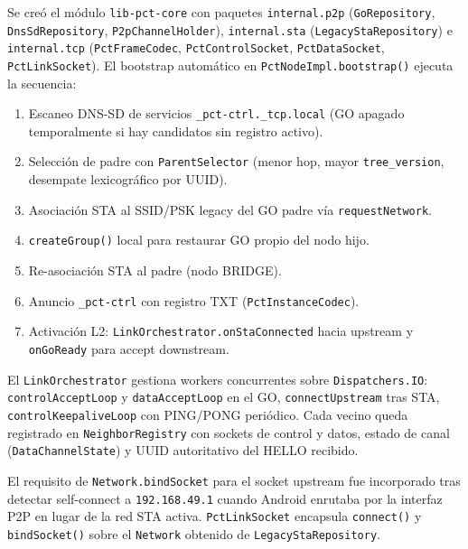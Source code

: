
Se creó el módulo \texttt{lib-pct-core} con paquetes \texttt{internal.p2p} (\texttt{GoRepository}, \texttt{DnsSdRepository}, \texttt{P2pChannelHolder}), \texttt{internal.sta} (\texttt{LegacyStaRepository}) e \texttt{internal.tcp} (\texttt{PctFrameCodec}, \texttt{PctControlSocket}, \texttt{PctDataSocket}, \texttt{PctLinkSocket}). El bootstrap automático en \texttt{PctNodeImpl.bootstrap()} ejecuta la secuencia:

\begin{enumerate}
  \item Escaneo DNS-SD de servicios \texttt{\_pct-ctrl.\_tcp.local} (GO apagado temporalmente si hay candidatos sin registro activo).
  \item Selección de padre con \texttt{ParentSelector} (menor hop, mayor \texttt{tree\_version}, desempate lexicográfico por UUID).
  \item Asociación STA al SSID/PSK legacy del GO padre vía \texttt{requestNetwork}.
  \item \texttt{createGroup()} local para restaurar GO propio del nodo hijo.
  \item Re-asociación STA al padre (nodo BRIDGE).
  \item Anuncio \texttt{\_pct-ctrl} con registro TXT (\texttt{PctInstanceCodec}).
  \item Activación L2: \texttt{LinkOrchestrator.onStaConnected} hacia upstream y \texttt{onGoReady} para accept downstream.
\end{enumerate}


El \texttt{LinkOrchestrator} gestiona workers concurrentes sobre \texttt{Dispatchers.IO}: \texttt{controlAcceptLoop} y \texttt{dataAcceptLoop} en el GO, \texttt{connectUpstream} tras STA, \texttt{controlKeepaliveLoop} con PING/PONG periódico. Cada vecino queda registrado en \texttt{NeighborRegistry} con sockets de control y datos, estado de canal (\texttt{DataChannelState}) y UUID autoritativo del HELLO recibido.

El requisito de \texttt{Network.bindSocket} para el socket upstream fue incorporado tras detectar self-connect a \texttt{192.168.49.1} cuando Android enrutaba por la interfaz P2P en lugar de la red STA activa. \texttt{PctLinkSocket} encapsula \texttt{connect()} y \texttt{bindSocket()} sobre el \texttt{Network} obtenido de \texttt{LegacyStaRepository}.



